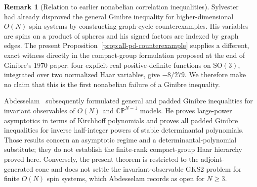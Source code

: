 \documentclass[11pt,reqno]{amsart}
\theoremstyle{plain}
\theoremstyle{definition}
\newtheorem{remark}[theorem]{Remark}
\begin{document}
\begin{remark}[Relation to earlier nonabelian correlation inequalities]
\label{rem:related-nonabelian-inequalities}
Sylvester~\cite[Secs.~1, 3--4]{Sylvester1980} had already disproved the
general Ginibre inequality for higher-dimensional $O(N)$ spin systems by
constructing graph-cycle counterexamples.  His variables are spins on a
product of spheres and his signed factors are indexed by graph edges.  The
present Proposition~\ref{prop:all-pd-counterexample} supplies a different,
exact witness directly in the compact-group formulation proposed at the end
of Ginibre's 1970 paper: four explicit real positive-definite functions on
$\mathrm{SO}(3)$, integrated over two normalized Haar variables, give
$-8/279$.  We therefore make no claim that this is the first nonabelian
failure of a Ginibre inequality.

Abdesselam~\cite[Sec.~1 and Thms.~2.1--2.3]{Abdesselam2022} subsequently
formulated general and padded Ginibre inequalities for invariant observables
of $O(N)$ and $\mathbb{CP}^{N-1}$ models.  He proves large-power asymptotics
in terms of Kirchhoff polynomials and proves all padded Ginibre inequalities
for inverse half-integer powers of stable determinantal polynomials.  Those
results concern an asymptotic regime and a determinantal-polynomial
substitute; they do not establish the finite-rank compact-group Haar
hierarchy proved here.  Conversely, the present theorem is restricted to the
adjoint-generated cone and does not settle the invariant-observable GKS2
problem for finite $O(N)$ spin systems, which Abdesselam records as open for
$N\geq3$.
\end{remark}
\end{document}
